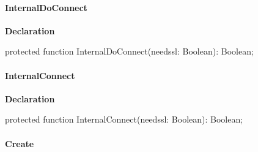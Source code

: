 \documentclass{report}
\newif\ifpdf
\begin{document}
\paragraph*{InternalDoConnect}\hspace*{\fill}

\label{httpsend.THTTPSend-InternalDoConnect}
\begin{list}{}{
\setlength{\itemindent}{0cm}
\setlength{\listparindent}{0cm}
\setlength{\leftmargin}{\evensidemargin}
\addtolength{\leftmargin}{\tmplength}
\settowidth{\labelsep}{X}
\addtolength{\leftmargin}{\labelsep}
\setlength{\labelwidth}{\tmplength}
}
\item[\textbf{Declaration}\hfill]
\ifpdf
\begin{flushleft}
\fi
\begin{ttfamily}
protected function InternalDoConnect(needssl: Boolean): Boolean;\end{ttfamily}

\ifpdf
\end{flushleft}
\fi

\end{list}
\paragraph*{InternalConnect}\hspace*{\fill}

\label{httpsend.THTTPSend-InternalConnect}
\begin{list}{}{
\setlength{\itemindent}{0cm}
\setlength{\listparindent}{0cm}
\setlength{\leftmargin}{\evensidemargin}
\addtolength{\leftmargin}{\tmplength}
\settowidth{\labelsep}{X}
\addtolength{\leftmargin}{\labelsep}
\setlength{\labelwidth}{\tmplength}
}
\item[\textbf{Declaration}\hfill]
\ifpdf
\begin{flushleft}
\fi
\begin{ttfamily}
protected function InternalConnect(needssl: Boolean): Boolean;\end{ttfamily}

\ifpdf
\end{flushleft}
\fi

\end{list}
\paragraph*{Create}\hspace*{\fill}
\end{document}
